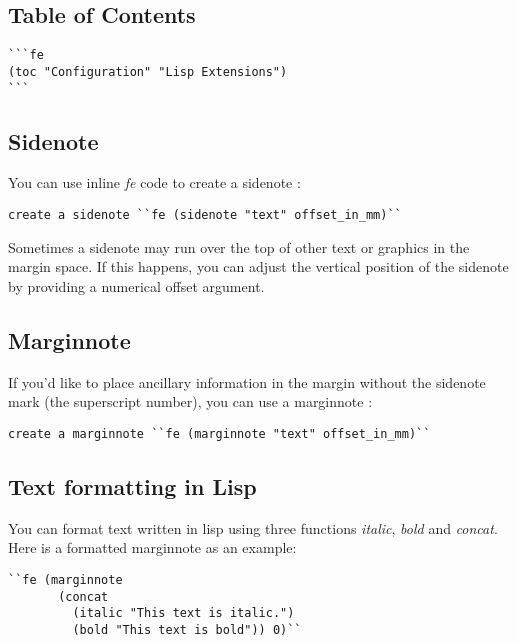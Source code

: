 \documentclass{tufte-handout}
\begin{document}
\subsection{Table of Contents}\begin{verbatim}
```fe
(toc "Configuration" "Lisp Extensions")
```

\end{verbatim}
\subsection{Sidenote}
You can use inline \textit{fe} code to create a sidenote :\begin{verbatim}
create a sidenote ``fe (sidenote "text" offset_in_mm)``

\end{verbatim}

Sometimes a sidenote may run over the top of other text or graphics in the margin space.
If this happens, you can adjust the vertical position of the sidenote by providing a numerical offset argument.\subsection{Marginnote}
If you'd like to place ancillary information in the margin without the sidenote mark (the superscript number),
you can use a marginnote :\begin{verbatim}
create a marginnote ``fe (marginnote "text" offset_in_mm)``

\end{verbatim}
\subsection{Text formatting in Lisp}
You can format text written in lisp using three functions \textit{italic}, \textit{bold} and \textit{concat}.
Here is a formatted marginnote as an example: \begin{verbatim}
``fe (marginnote 
       (concat 
         (italic "This text is italic.") 
         (bold "This text is bold")) 0)``

\end{verbatim}
\end{document}
